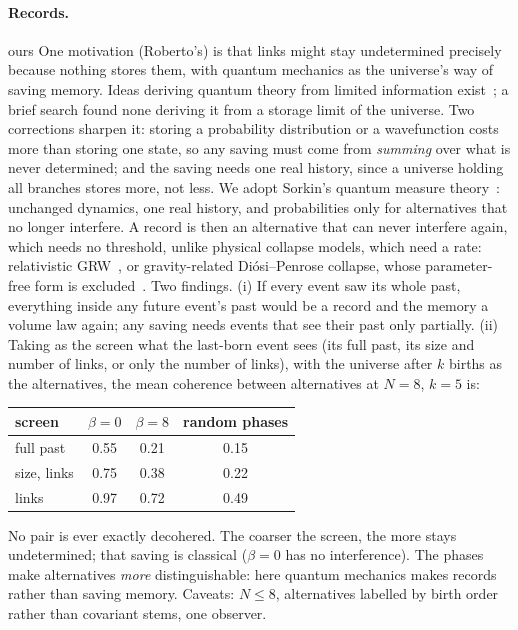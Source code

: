 \documentclass[11pt,a4paper]{article}
\newcommand{\tagbox}[2]{\textsf{\scriptsize\colorbox{#1!12}{\textcolor{#1!70!black}{#2}}}}
\newcommand{\ours}{\tagbox{orange}{ours}}
\begin{document}
\paragraph{Records.} \ours{} One motivation (Roberto's) is that links might stay undetermined precisely because nothing stores them, with quantum mechanics as the universe's way of saving memory. Ideas deriving quantum theory from limited information exist~\cite{Zeilinger99,Spekkens07}; a brief search found none deriving it from a storage limit of the universe. Two corrections sharpen it: storing a probability distribution or a wavefunction costs more than storing one state, so any saving must come from \emph{summing} over what is never determined; and the saving needs one real history, since a universe holding all branches stores more, not less. We adopt Sorkin's quantum measure theory~\cite{Sorkin94}: unchanged dynamics, one real history, and probabilities only for alternatives that no longer interfere. A record is then an alternative that can never interfere again, which needs no threshold, unlike physical collapse models, which need a rate: relativistic GRW~\cite{Tumulka06}, or gravity-related Di\'osi--Penrose collapse, whose parameter-free form is excluded~\cite{Donadi20}. Two findings. (i) If every event saw its whole past, everything inside any future event's past would be a record and the memory a volume law again; any saving needs events that see their past only partially. (ii) Taking as the screen what the last-born event sees (its full past, its size and number of links, or only the number of links), with the universe after $k$ births as the alternatives, the mean coherence between alternatives at $N=8$, $k=5$ is:
\begin{center}\small
\begin{tabular}{@{}lccc@{}}
\toprule
screen & $\beta=0$ & $\beta=8$ & random phases\\
\midrule
full past & 0.55 & 0.21 & 0.15\\
size, links & 0.75 & 0.38 & 0.22\\
links & 0.97 & 0.72 & 0.49\\
\bottomrule
\end{tabular}
\end{center}
No pair is ever exactly decohered. The coarser the screen, the more stays undetermined; that saving is classical ($\beta=0$ has no interference). The phases make alternatives \emph{more} distinguishable: here quantum mechanics makes records rather than saving memory. Caveats: $N\le8$, alternatives labelled by birth order rather than covariant stems, one observer.
\end{document}
